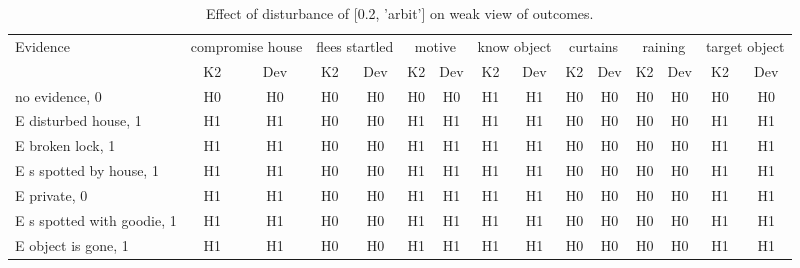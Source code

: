 \begin{table}\begin{tabular}{l|cc|cc|cc|cc|cc|cc|cc}\toprule\multirow{2}{*}{Evidence} & \multicolumn{2}{c}{compromise house}& \multicolumn{2}{c}{flees startled}& \multicolumn{2}{c}{motive}& \multicolumn{2}{c}{know object}& \multicolumn{2}{c}{curtains}& \multicolumn{2}{c}{raining}& \multicolumn{2}{c}{target object}\\& {K2} & {Dev}& {K2} & {Dev}& {K2} & {Dev}& {K2} & {Dev}& {K2} & {Dev}& {K2} & {Dev}& {K2} & {Dev}\\\midrule
no evidence, 0 & H0&H0&H0&H0&H0&H0&H1&H1&H0&H0&H0&H0&H0&H0\\E disturbed house, 1 & H1&H1&H0&H0&H1&H1&H1&H1&H0&H0&H0&H0&H1&H1\\E broken lock, 1 & H1&H1&H0&H0&H1&H1&H1&H1&H0&H0&H0&H0&H1&H1\\E s spotted by house, 1 & H1&H1&H0&H0&H1&H1&H1&H1&H0&H0&H0&H0&H1&H1\\E private, 0 & H1&H1&H0&H0&H1&H1&H1&H1&H0&H0&H0&H0&H1&H1\\E s spotted with goodie, 1 & H1&H1&H0&H0&H1&H1&H1&H1&H0&H0&H0&H0&H1&H1\\E object is gone, 1 & H1&H1&H0&H0&H1&H1&H1&H1&H0&H0&H0&H0&H1&H1\\\bottomrule\end{tabular}\caption{Effect of disturbance of [0.2, 'arbit'] on weak view of outcomes.}\end{table}